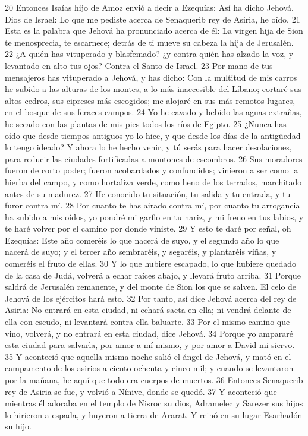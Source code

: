 20 Entonces Isaías hijo de Amoz envió a decir a Ezequías: Así ha dicho Jehová, Dios de Israel: Lo que me pediste acerca de Senaquerib rey de Asiria, he oído.
21 Esta es la palabra que Jehová ha pronunciado acerca de él: La virgen hija de Sion te menosprecia, te escarnece; detrás de ti mueve su cabeza la hija de Jerusalén.
22 ¿A quién has vituperado y blasfemado? ¿y contra quién has alzado la voz, y levantado en alto tus ojos? Contra el Santo de Israel.
23 Por mano de tus mensajeros has vituperado a Jehová, y has dicho: Con la multitud de mis carros he subido a las alturas de los montes, a lo más inaccesible del Líbano; cortaré sus altos cedros, sus cipreses más escogidos; me alojaré en sus más remotos lugares, en el bosque de sus feraces campos.
24 Yo he cavado y bebido las aguas extrañas, he secado con las plantas de mis pies todos los ríos de Egipto.
25 ¿Nunca has oído que desde tiempos antiguos yo lo hice, y que desde los días de la antigüedad lo tengo ideado? Y ahora lo he hecho venir, y tú serás para hacer desolaciones, para reducir las ciudades fortificadas a montones de escombros.
26 Sus moradores fueron de corto poder; fueron acobardados y confundidos; vinieron a ser como la hierba del campo, y como hortaliza verde, como heno de los terrados, marchitado antes de su madurez.
27 He conocido tu situación, tu salida y tu entrada, y tu furor contra mí.
28 Por cuanto te has airado contra mí, por cuanto tu arrogancia ha subido a mis oídos, yo pondré mi garfio en tu nariz, y mi freno en tus labios, y te haré volver por el camino por donde viniste.
29 Y esto te daré por señal, oh Ezequías: Este año comeréis lo que nacerá de suyo, y el segundo año lo que nacerá de suyo; y el tercer año sembraréis, y segaréis, y plantaréis viñas, y comeréis el fruto de ellas.
30 Y lo que hubiere escapado, lo que hubiere quedado de la casa de Judá, volverá a echar raíces abajo, y llevará fruto arriba.
31 Porque saldrá de Jerusalén remanente, y del monte de Sion los que se salven. El celo de Jehová de los ejércitos hará esto.
32 Por tanto, así dice Jehová acerca del rey de Asiria: No entrará en esta ciudad, ni echará saeta en ella; ni vendrá delante de ella con escudo, ni levantará contra ella baluarte.
33 Por el mismo camino que vino, volverá, y no entrará en esta ciudad, dice Jehová.
34 Porque yo ampararé esta ciudad para salvarla, por amor a mí mismo, y por amor a David mi siervo.
35 Y aconteció que aquella misma noche salió el ángel de Jehová, y mató en el campamento de los asirios a ciento ochenta y cinco mil; y cuando se levantaron por la mañana, he aquí que todo era cuerpos de muertos.
36 Entonces Senaquerib rey de Asiria se fue, y volvió a Nínive, donde se quedó.
37 Y aconteció que mientras él adoraba en el templo de Nisroc su dios, Adramelec y Sarezer sus hijos lo hirieron a espada, y huyeron a tierra de Ararat. Y reinó en su lugar Esarhadón su hijo.

